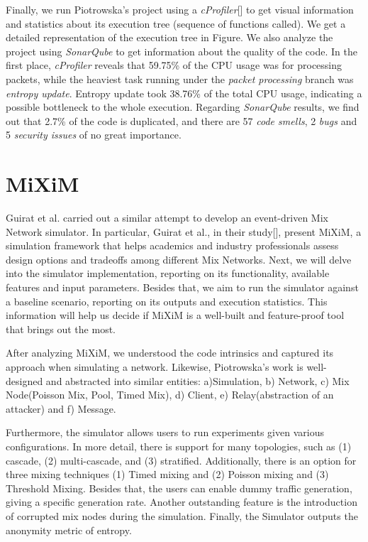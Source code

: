\documentclass[logo,msc,cyber]{infthesis}   %
\begin{document}
Finally, we run Piotrowska's project using a \emph{cProfiler}[] to get visual
information and statistics about its execution tree (sequence of functions
called). We get a detailed representation of the execution tree in Figure. We
also analyze the project using \emph{SonarQube} to get information about the
quality of the code. In the first place, \emph{cProfiler} reveals that 59.75\%
of the CPU usage was for processing packets, while the heaviest task running
under the \emph{packet processing} branch was \emph{entropy update}. Entropy
update took 38.76\% of the total CPU usage, indicating a possible bottleneck to
the whole execution. Regarding \emph{SonarQube} results, we find out that 2.7\%
of the code is duplicated, and there are 57 \emph{code smells}, 2 \emph{bugs}
and 5 \emph{security issues} of no great importance.

\section{MiXiM}

Guirat et al. carried out a similar attempt to develop an event-driven Mix
Network simulator. In particular, Guirat et al., in their study[], present
MiXiM, a simulation framework that helps academics and industry professionals
assess design options and tradeoffs among different Mix Networks. Next, we will
delve into the simulator implementation, reporting on its functionality,
available features and input parameters. Besides that, we aim to run the
simulator against a baseline scenario, reporting on its outputs and execution
statistics. This information will help us decide if MiXiM is a well-built and
feature-proof tool that brings out the most.

After analyzing MiXiM, we understood the code intrinsics and captured its
approach when simulating a network. Likewise, Piotrowska's work is well-designed
and abstracted into similar entities: a)Simulation, b) Network, c) Mix
Node(Poisson Mix, Pool, Timed Mix), d) Client, e) Relay(abstraction of an
attacker) and f) Message.

Furthermore, the simulator allows users to run experiments given various
configurations. In more detail, there is support for many topologies, such as
(1) cascade, (2) multi-cascade, and (3) stratified. Additionally, there is an
option for three mixing techniques (1) Timed mixing and (2) Poisson mixing and
(3) Threshold Mixing. Besides that, the users can enable dummy traffic
generation, giving a specific generation rate. Another outstanding feature is
the introduction of corrupted mix nodes during the simulation. Finally, the
Simulator outputs the anonymity metric of entropy.
\end{document}
